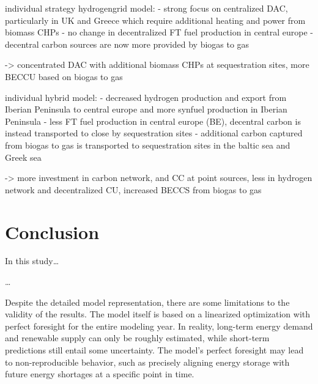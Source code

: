 \documentclass[twocolumn]{article}
\begin{document}


individual strategy hydrogengrid model:
- strong focus on centralized DAC, particularly in UK and Greece which require additional heating and power from biomass CHPs
- no change in decentralized FT fuel production in central europe
- decentral carbon sources are now more provided by biogas to gas

-> concentrated DAC with additional biomass CHPs at sequestration sites, more BECCU based on biogas to gas


individual hybrid model:
- decreased hydrogen production and export from Iberian Peninsula to central europe and more synfuel production in Iberian Peninsula
- less FT fuel production in central europe (BE), decentral carbon is instead transported to close by sequestration sites
- additional carbon captured from biogas to gas is transported to sequestration sites in the baltic sea and Greek sea

-> more investment in carbon network, and CC at point sources, less in hydrogen network and decentralized CU, increased BECCS from biogas to gas



\section{Conclusion}
\label{sec:conclusion}


In this study\dots

\dots

Despite the detailed model representation, there are some limitations to the validity of the results. The model itself is based on a linearized optimization with perfect foresight for the entire modeling year. In reality, long-term energy demand and renewable supply can only be roughly estimated, while short-term predictions still entail some uncertainty. The model's perfect foresight may lead to non-reproducible behavior, such as precisely aligning energy storage with future energy shortages at a specific point in time.
\end{document}

